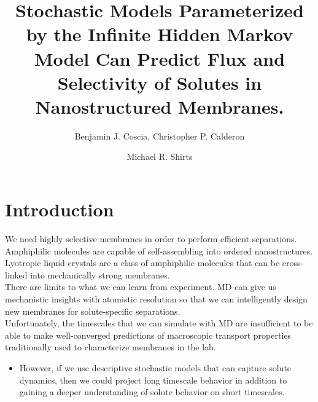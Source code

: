\documentclass{article}
\title{Stochastic Models Parameterized by the Infinite Hidden Markov Model Can Predict Flux and Selectivity of Solutes in Nanostructured Membranes.}
\author{Benjamin J. Coscia, Christopher P. Calderon \and Michael R. Shirts}
\begin{document}
  \graphicspath{{./figures/}}
  \maketitle

  \section{Introduction}
  
  We need highly selective membranes in order to perform efficient separations. \\

  \noindent Amphiphilic molecules are capable of self-assembling into ordered nanostructures.\\

  Lyotropic liquid crystals are a class of amphiphilic molecules that can be cross-linked
  into mechanically strong membranes.\\

  There are limits to what we can learn from experiment.
  MD can give us mechanistic insights with
  atomistic resolution so that we can intelligently design new membranes for 
  solute-specific separations.\\

  Unfortunately, the timescales that we can simulate with MD are insufficient to be
  able to make well-converged predictions of macroscopic transport properties 
  traditionally used to characterize membranes in the lab.
  \begin{itemize}
    \item However, if we use descriptive stochastic models that can capture solute
    dynamics, then we could project long timescale behavior in addition to gaining
    a deeper understanding of solute behavior on short timescales.
  \end{itemize}
  
\end{document}
